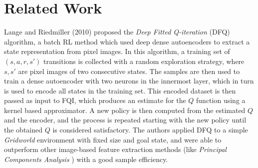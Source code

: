 \section{Related Work}
Lange and Riedmiller (2010) \cite{lange2010deep} proposed the \textit{Deep 
Fitted Q-iteration} (DFQ) algorithm, a batch RL method which used deep dense 
autoencoders to extract a state representation from pixel images. 
In this algorithm, a training set of $(s, a, r, s')$ transitions is collected
with a random exploration strategy, where $s, s'$ are pixel images of two 
consecutive states. The samples are then used to train a dense autoencoder with 
two neurons in the innermost layer, which in turn is used to encode all states 
in the training set. This encoded dataset is then passed as input to FQI, 
which produces an estimate for the $Q$ function using a kernel based 
approximator. A new policy is then computed from the estimated $Q$ and the 
encoder, and the process is repeated starting with the new policy until the 
obtained $Q$ is considered satisfactory.
The authors applied DFQ to a simple \textit{Gridworld} environment with fixed 
size and goal state, and were able to outperform other image-based feature
extraction methods (like \textit{Principal Components Analysis} 
\cite{wold1987principal}) with a good sample efficiency.


























